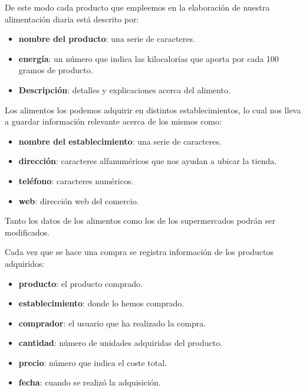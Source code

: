 \documentclass[a4paper,12pt]{report}
\begin{document}
De este modo cada producto que empleemos en la elaboración de
nuestra alimentación diaria está descrito por:
\begin{itemize}
\item \textbf{nombre del producto}: una serie de caracteres.
\item \textbf{energía}: un número que indica las kilocalorías que aporta por
cada 100 gramos de producto.
\item \textbf{Descripción}: detalles y explicaciones acerca del alimento.
\end{itemize}

Los alimentos los podemos adquirir en distintos establecimientos,
lo cual nos lleva a guardar información relevante acerca de los
mismos como:
\begin{itemize}
\item \textbf{nombre del establecimiento}: una serie de caracteres.
\item \textbf{dirección}: caracteres alfanuméricos que nos ayudan a ubicar la tienda.
\item \textbf{teléfono}: caracteres numéricos.
\item \textbf{web}: dirección web del comercio.
\end{itemize}

Tanto los datos de los alimentos como los de los supermercados
podrán ser modificados.


Cada vez que se hace una compra se registra información de los
productos adquiridos:
\begin{itemize}
\item \textbf{producto}: el producto comprado.
\item \textbf{establecimiento}: donde lo hemos comprado.
\item \textbf{comprador}: el usuario que ha realizado la compra.
\item \textbf{cantidad}: número de unidades adquiridas del producto.
\item \textbf{precio}: número que indica el coste total.
\item \textbf{fecha}: cuando se realizó la adquisición.
\end{itemize}
\end{document}
